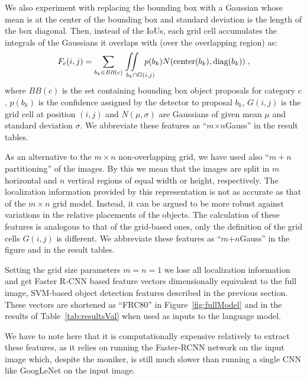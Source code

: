 We also experiment with replacing the bounding box with a Gaussian whose mean is
at the center of the bounding box and standard deviation is the length of the
box diagonal.
Then, instead of the IoUs, each grid cell accumulates the integrals of the
Gaussians it overlaps with (over the overlapping region) as:
\begin{equation} \label{eqn:Gauss} F_c(i,j) = \sum_{b_k \in \text{\it
        BB}(c)}\text{\hspace*{-7mm}} \iint\displaylimits_%
{\text{\hspace{9mm}}b_k \cap G(i,j)}\text{\hspace*{-5mm}}
p(b_k)N(\text{center}(b_k),\text{diag}(b_k)) \; , \end{equation}
\noindent where $BB(c)$ is the set containing bounding box object proposals for
category $c$, $p(b_k)$ is the confidence assigned by the detector to proposal
$b_k$, $G(i,j)$ is the grid cell at position $(i,j)$ and $N(\mu,\sigma)$ are
Gaussians of given mean $\mu$ and standard deviation $\sigma$.
We abbreviate these features as ``$m$$\times${}$n$Gauss'' in the result tables.

As an alternative to the $m\times n$ non-overlapping grid, we have used also
``$m+n$ partitioning'' of the images.
By this we mean that the images are split in $m$ horizontal and $n$ vertical
regions of equal width or height, respectively.
The localization information provided by this representation is not as accurate
as that of the $m\times n$ grid model.
Instead, it can be argued to be more robust against variations in the relative
placements of the objects.
The calculation of these features is analogous to that of the grid-based ones,
only the definition of the grid cells $G(i,j)$ is different.
We abbreviate these features as ``$m$+$n$Gauss'' in the figure and in the result
tables.

Setting the grid size parameters $m=n=1$ we lose all localization information
and get Faster R-CNN based feature vectors dimensionally equivalent to the full
image, SVM-based object detection features described in the previous section.
These vectors are shortened as ``FRC80'' in Figure~\ref{fig:fullModel} and in
the results of Table~\ref{tab:resultsVal} when used as inputs to the language
model.

We have to note here that it is computationally expensive relatively to extract
these features, as it relies on running the Faster-RCNN network on the input
image which, despite the moniker, is still much slower than running a single CNN
like GoogLeNet on the input image.

